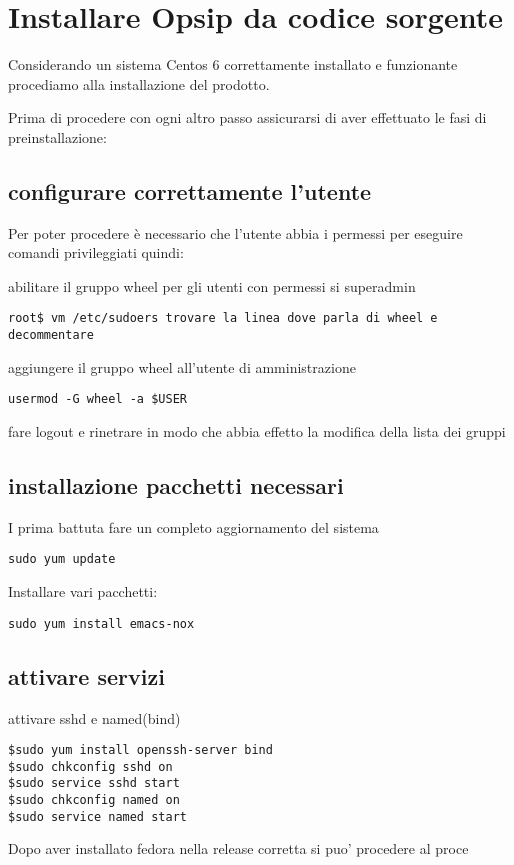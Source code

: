\section{Installare Opsip da codice sorgente}

Considerando un sistema Centos \textsuperscript{\textregistered} 6 correttamente installato e funzionante procediamo alla installazione del prodotto.

Prima di procedere con ogni altro passo assicurarsi di aver effettuato le fasi di preinstallazione:

\subsection{configurare correttamente l'utente}

Per poter procedere \`e necessario che l'utente abbia i permessi per eseguire comandi privileggiati quindi:

abilitare il gruppo wheel per gli utenti con permessi si superadmin 

\begin{verbatim}
root$ vm /etc/sudoers trovare la linea dove parla di wheel e decommentare
\end{verbatim}

aggiungere il gruppo wheel all'utente di amministrazione 

\begin{verbatim}
usermod -G wheel -a $USER
\end{verbatim}

fare logout e rinetrare in modo che abbia effetto la modifica della lista dei gruppi

\subsection{installazione pacchetti necessari}

I prima battuta fare un completo aggiornamento del sistema

\begin{verbatim}
sudo yum update
\end{verbatim}

Installare vari pacchetti:
\begin{verbatim}
sudo yum install emacs-nox 
\end{verbatim}

\subsection{attivare servizi}
attivare sshd e named(bind)

\begin{verbatim}
$sudo yum install openssh-server bind
$sudo chkconfig sshd on
$sudo service sshd start
$sudo chkconfig named on 
$sudo service named start
\end{verbatim}

Dopo aver installato fedora nella release corretta si puo' procedere al proce
